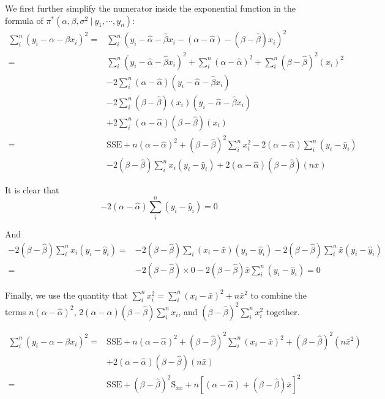 \documentclass[]{book}
\theoremstyle{definition}
\theoremstyle{definition}
\theoremstyle{definition}
\theoremstyle{remark}
\begin{document}
We first further simplify the numerator inside the exponential function
in the formula of \(\pi^*(\alpha, \beta, \sigma^2~|~y_1,\cdots,y_n)\):
\[ 
\begin{aligned}
\sum_i^n \left(y_i - \alpha - \beta x_i\right)^2 = & \sum_i^n \left(y_i - \hat{\alpha} - \hat{\beta}x_i - (\alpha - \hat{\alpha}) - (\beta - \hat{\beta})x_i\right)^2 \\
= & \sum_i^n \left(y_i - \hat{\alpha} - \hat{\beta}x_i\right)^2 + \sum_i^n (\alpha - \hat{\alpha})^2 + \sum_i^n (\beta-\hat{\beta})^2(x_i)^2 \\
  & - 2\sum_i^n (\alpha - \hat{\alpha})(y_i-\hat{\alpha}-\hat{\beta}x_i)\\
  & - 2\sum_i^n (\beta-\hat{\beta})(x_i)(y_i-\hat{\alpha}-\hat{\beta}x_i)\\
  & + 2\sum_i^n(\alpha - \hat{\alpha})(\beta-\hat{\beta})(x_i)\\
= & \text{SSE} + n(\alpha-\hat{\alpha})^2 + (\beta-\hat{\beta})^2\sum_i^n x_i^2 - 2(\alpha-\hat{\alpha})\sum_i^n (y_i-\hat{y}_i) \\
  & -2(\beta-\hat{\beta})\sum_i^n x_i(y_i-\hat{y}_i)+2(\alpha-\hat{\alpha})(\beta-\hat{\beta})(n\bar{x})
\end{aligned}
\]

It is clear that
\[ -2(\alpha-\hat{\alpha})\sum_i^n(y_i-\hat{y}_i) = 0 \]

And \[
\begin{aligned}
-2(\beta-\hat{\beta})\sum_i^n x_i(y_i-\hat{y}_i) = & -2(\beta-\hat{\beta})\sum_i(x_i-\bar{x})(y_i-\hat{y}_i) - 2(\beta-\hat{\beta})\sum_i^n \bar{x}(y_i-\hat{y}_i) \\
= & -2(\beta-\hat{\beta})\times 0 - 2(\beta-\hat{\beta})\bar{x}\sum_i^n(y_i-\hat{y}_i) = 0
\end{aligned}
\]

Finally, we use the quantity that
\(\displaystyle \sum_i^n x_i^2 = \sum_i^n(x_i-\bar{x})^2+ n\bar{x}^2\)
to combine the terms \(n(\alpha-\hat{\alpha})^2\),
\(2\displaystyle (\alpha-\hat{\alpha})(\beta-\hat{\beta})\sum_i^n x_i\),
and \(\displaystyle (\beta-\hat{\beta})^2\sum_i^n x_i^2\) together.

\[
\begin{aligned}
\sum_i^n (y_i-\alpha-\beta x_i)^2 = & \text{SSE} + n(\alpha-\hat{\alpha})^2 +(\beta-\hat{\beta})^2\sum_i^n (x_i-\bar{x})^2 + (\beta-\hat{\beta})^2 (n\bar{x}^2) \\
& +2(\alpha-\hat{\alpha})(\beta-\hat{\beta})(n\bar{x})\\
= & \text{SSE} + (\beta-\hat{\beta})^2\text{S}_{xx} + n\left[(\alpha-\hat{\alpha}) +(\beta-\hat{\beta})\bar{x}\right]^2
\end{aligned}
\]
\end{document}
